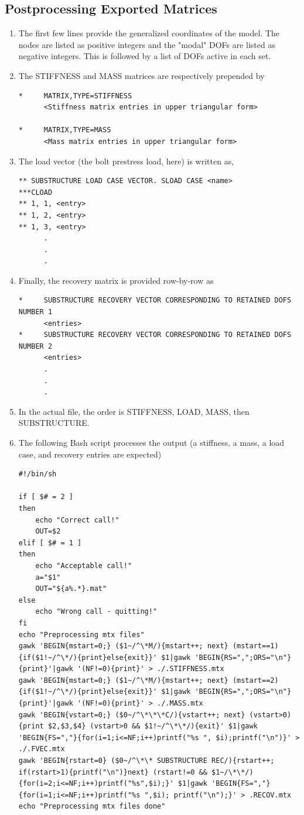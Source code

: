 \documentclass[11pt]{article}
\begin{document}
\subsection{Postprocessing Exported Matrices}
\label{sec:orga259c32}
\begin{enumerate}
\item The first few lines provide the generalized coordinates of the model. The nodes are listed as positive integers and the "modal" DOFs are listed as negative integers.
This is followed by a list of DOFs active in each set.
\item The STIFFNESS and MASS matrices are respectively prepended by
\begin{verbatim}
*     MATRIX,TYPE=STIFFNESS
      <Stiffness matrix entries in upper triangular form>

*     MATRIX,TYPE=MASS
      <Mass matrix entries in upper triangular form>      
\end{verbatim}
\item The load vector (the bolt prestress load, here) is written as,
\begin{verbatim}
** SUBSTRUCTURE LOAD CASE VECTOR. SLOAD CASE <name>
***CLOAD 
** 1, 1, <entry>
** 1, 2, <entry>
** 1, 3, <entry>
      .
      .
      .
\end{verbatim}
\item Finally, the recovery matrix is provided row-by-row as
\begin{verbatim}
*     SUBSTRUCTURE RECOVERY VECTOR CORRESPONDING TO RETAINED DOFS NUMBER 1
      <entries>
*     SUBSTRUCTURE RECOVERY VECTOR CORRESPONDING TO RETAINED DOFS NUMBER 2
      <entries>
      .
      .
      .
\end{verbatim}
\item In the actual file, the order is STIFFNESS, LOAD, MASS, then SUBSTRUCTURE.
\item The following Bash script processes the output (a stiffness, a mass, a load case, and recovery entries are expected)
\begin{verbatim}
#!/bin/sh

if [ $# = 2 ]
then 
    echo "Correct call!"
    OUT=$2
elif [ $# = 1 ]
then
    echo "Acceptable call!"
    a="$1"
    OUT="${a%.*}.mat"
else
    echo "Wrong call - quitting!"
fi
echo "Preprocessing mtx files"
gawk 'BEGIN{mstart=0;} ($1~/^\*M/){mstart++; next} (mstart==1){if($1!~/^\*/){print}else{exit}}' $1|gawk 'BEGIN{RS=",";ORS="\n"}{print}'|gawk '(NF!=0){print}' > ./.STIFFNESS.mtx
gawk 'BEGIN{mstart=0;} ($1~/^\*M/){mstart++; next} (mstart==2){if($1!~/^\*/){print}else{exit}}' $1|gawk 'BEGIN{RS=",";ORS="\n"}{print}'|gawk '(NF!=0){print}' > ./.MASS.mtx
gawk 'BEGIN{vstart=0;} ($0~/^\*\*\*C/){vstart++; next} (vstart>0){print $2,$3,$4} (vstart>0 && $1!~/^\*\*/){exit}' $1|gawk 'BEGIN{FS=","}{for(i=1;i<=NF;i++)printf("%s ", $i);printf("\n")}' > ./.FVEC.mtx
gawk 'BEGIN{rstart=0} ($0~/^\*\* SUBSTRUCTURE REC/){rstart++; if(rstart>1){printf("\n")}next} (rstart!=0 && $1~/\*\*/){for(i=2;i<=NF;i++)printf("%s",$i);}' $1|gawk 'BEGIN{FS=","}{for(i=1;i<=NF;i++)printf("%s ",$i); printf("\n");}' > .RECOV.mtx
echo "Preprocessing mtx files done"


\end{verbatim}
\end{enumerate}
\end{document}
